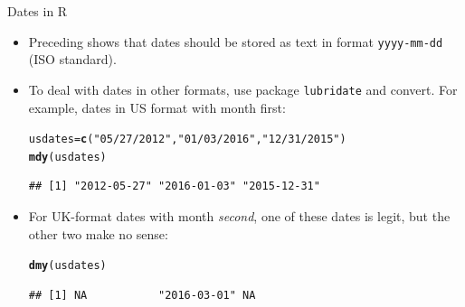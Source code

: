 \documentclass[unknownkeysallowed]{beamer}\usepackage[]{graphicx}\usepackage[]{color}
\makeatletter
\newcommand{\hlstr}[1]{\textcolor[rgb]{0.192,0.494,0.8}{#1}}%
\newcommand{\hlstd}[1]{\textcolor[rgb]{0.345,0.345,0.345}{#1}}%
\newcommand{\hlkwb}[1]{\textcolor[rgb]{0.69,0.353,0.396}{#1}}%
\newcommand{\hlkwd}[1]{\textcolor[rgb]{0.737,0.353,0.396}{\textbf{#1}}}%
\newenvironment{kframe}{%
 \def\at@end@of@kframe{}%
 \ifinner\ifhmode%
  \def\at@end@of@kframe{\end{minipage}}%
  \begin{minipage}{\columnwidth}%
 \fi\fi%
 \def\FrameCommand##1{\hskip\@totalleftmargin \hskip-\fboxsep
 \colorbox{shadecolor}{##1}\hskip-\fboxsep
     \hskip-\linewidth \hskip-\@totalleftmargin \hskip\columnwidth}%
 \MakeFramed {\advance\hsize-\width
   \@totalleftmargin\z@ \linewidth\hsize
   \@setminipage}}%
 {\par\unskip\endMakeFramed%
 \at@end@of@kframe}
\newenvironment{knitrout}{}{} %
\makeatother
\begin{document}
\begin{frame}[fragile]{Dates in R}
  
  \begin{itemize}
  \item Preceding shows that dates should be stored as text in format
    \texttt{yyyy-mm-dd} (ISO standard).
  \item To deal with dates in other formats, use package
    \texttt{lubridate} and convert. For example, dates in US format
    with month first:
\begin{knitrout}
\color{fgcolor}\begin{kframe}
\begin{alltt}
\hlstd{usdates}\hlkwb{=}\hlkwd{c}\hlstd{(}\hlstr{"05/27/2012"}\hlstd{,}\hlstr{"01/03/2016"}\hlstd{,}\hlstr{"12/31/2015"}\hlstd{)}
\hlkwd{mdy}\hlstd{(usdates)}
\end{alltt}
\begin{verbatim}
## [1] "2012-05-27" "2016-01-03" "2015-12-31"
\end{verbatim}
\end{kframe}
\end{knitrout}
\item For UK-format dates with month \emph{second}, one of these dates
  is legit, but the other two make no sense:
  
\begin{knitrout}
\color{fgcolor}\begin{kframe}
\begin{alltt}
\hlkwd{dmy}\hlstd{(usdates)}
\end{alltt}


{\ttfamily\noindent\color{warningcolor}{\#\# Warning:\ \ 2 failed to parse.}}\begin{verbatim}
## [1] NA           "2016-03-01" NA
\end{verbatim}
\end{kframe}
\end{knitrout}
  \end{itemize}
  
\end{frame}
\end{document}

